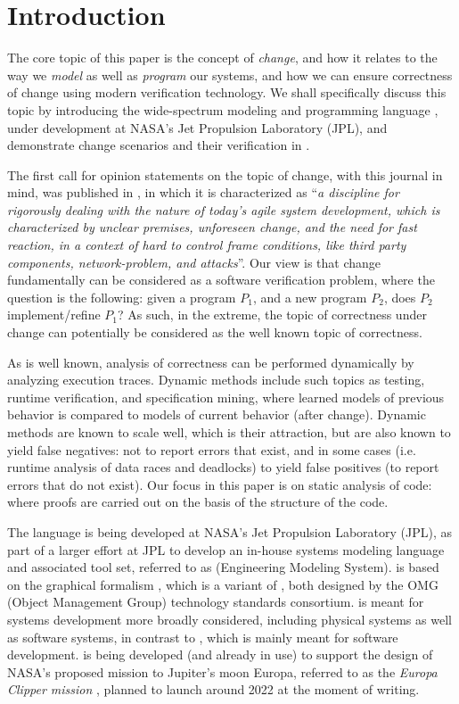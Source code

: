
\section{Introduction}

The core topic of this paper is the concept of {\em change}, and how
it relates to the way we {\em model} as well as {\em program} our
systems, and how we can ensure correctness of change using modern
verification technology.  We shall specifically discuss this topic by
introducing the wide-spectrum modeling and programming language
\Klang, under development at NASA's Jet Propulsion Laboratory (JPL),
and demonstrate change scenarios and their verification in \Klang.

The first call for opinion statements on the topic of change, with
this journal in mind, was published in \cite{steffen-isola-2014}, in
which it is characterized as ``{\em a discipline for rigorously
  dealing with the nature of today's agile system development, which
  is characterized by unclear premises, unforeseen change, and the
  need for fast reaction, in a context of hard to control frame
  conditions, like third party components, network-problem, and
  attacks}''.
%
Our view is that change fundamentally can be considered as a software
verification problem, where the question is the following: given a
program $P_1$, and a new program $P_2$, does $P_2$ implement/refine
$P_1$?  As such, in the extreme, the topic of correctness under change
can potentially be considered as the well known topic of correctness.

As is well known, analysis of correctness can be performed dynamically
by analyzing execution traces. Dynamic methods include such topics as
testing, runtime verification, and specification mining, where learned
models of previous behavior is compared to models of current behavior
(after change). Dynamic methods are known to scale well, which is
their attraction, but are also known to yield false negatives: not to
report errors that exist, and in some cases (i.e. runtime analysis of
data races and deadlocks) to yield false positives (to report errors
that do not exist). Our focus in this paper is on static analysis of
code: where proofs are carried out on the basis of the structure of
the code.

The \Klang{} language is being developed at NASA's Jet Propulsion
Laboratory (JPL), as part of a larger effort at JPL to develop an
in-house systems modeling language and associated tool set, referred
to as \ems{} (Engineering Modeling System). \ems{} is based on the
graphical \sysml{} formalism \cite{sysml}, which is a variant of
\uml{} \cite{uml}, both designed by the OMG (Object Management Group)
technology standards consortium. \sysml{} is meant for systems
development more broadly considered, including physical systems as
well as software systems, in contrast to \uml{}, which is mainly meant
for software development.  \ems{} is being developed (and already in
use) to support the design of NASA's proposed mission to Jupiter's
moon Europa, referred to as the {\em Europa Clipper mission}
\cite{europa-clipper}, planned to launch around 2022 at the moment of
writing.

